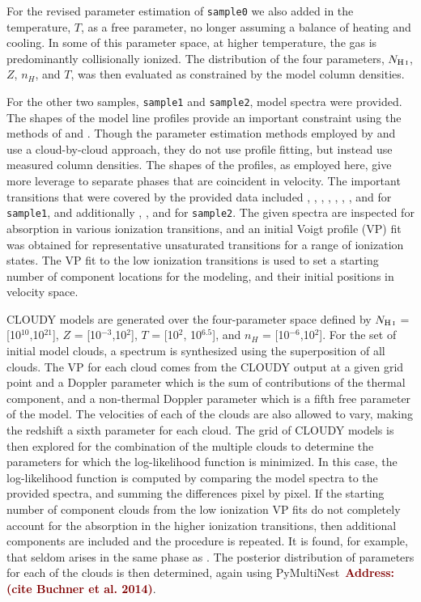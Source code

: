 \documentclass[fleqn,usenatbib]{mnras}
\newcommand{\todo}[1]{\textcolor{Maroon}{\textbf{Address: #1}}}
\begin{document}
For the revised parameter estimation of \texttt{sample0} we also added in the temperature, $T$, as a free parameter, no longer assuming a balance of heating and cooling.
In some of this parameter space, at higher temperature, the gas is predominantly collisionally ionized.
The distribution of the four parameters, $N_{\ion{H}{I}}$, $Z$, $n_H$, and $T$, was then evaluated as constrained by the model column densities.

For the other two samples, \texttt{sample1} and \texttt{sample2}, model spectra were provided.
The shapes of the model line profiles provide an important constraint using the methods of \cite{Sameer2021} and \cite{Sameer2022}.
Though the  parameter estimation methods employed by \cite{Zahedy2019} and \cite{Haislmaier2021} use a cloud-by-cloud approach, they do not use profile fitting, but instead use measured column densities.
The shapes of the profiles, as employed here, give more leverage to separate phases that are coincident in velocity.
The important transitions that were covered by the provided  data included , , , , , , , and  for \texttt{sample1}, and additionally , , and  for \texttt{sample2}.
The given spectra are inspected for absorption in various ionization transitions, and an initial Voigt profile (VP) fit was obtained for representative unsaturated transitions for a range of ionization states.
The VP fit to the low ionization transitions is used to set a starting number of component locations for the modeling, and their initial positions in velocity space.

CLOUDY models are generated over the four-parameter space defined by $N_{\ion{H}{I}}$ = [10$^{10}$,10$^{21}$], $Z$ = [10$^{-3}$,10$^{2}$], $T$ = [10$^{2}$, 10$^{6.5}$], and $n_H$ = [10$^{-6}$,10$^{2}$].
For the set of initial model clouds, a spectrum is synthesized using the superposition of all clouds.
The VP for each cloud comes from the CLOUDY output at a given grid point and a Doppler parameter which is the sum of contributions of the thermal component, and a non-thermal Doppler parameter which is a fifth free parameter of the model.
The velocities of each of the clouds are also allowed to vary, making the redshift a sixth parameter for each cloud.
The grid of CLOUDY models is then explored for the combination of the multiple clouds to determine the parameters for which the log-likelihood function is minimized.
In this case, the log-likelihood function is computed by comparing the model spectra to the provided spectra, and summing the differences pixel by pixel.
If the starting number of component clouds from the low ionization VP fits do not completely account for the absorption in the higher ionization transitions, then additional components are included and the procedure is repeated.
It is found, for example, that  seldom arises in the same phase as .
The posterior distribution of parameters for each of the clouds is then determined, again using PyMultiNest~\todo{(cite Buchner et al. 2014)}.
\end{document}
